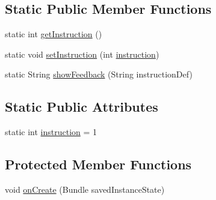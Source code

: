 \subsection*{Static Public Member Functions}
\begin{DoxyCompactItemize}
\item 
static int \mbox{\hyperlink{classcom_1_1example_1_1trainawearapplication_1_1_plank_a2220e1459dd56fb27948dcddf79bfcfa}{get\+Instruction}} ()
\item 
static void \mbox{\hyperlink{classcom_1_1example_1_1trainawearapplication_1_1_plank_a3cc3d10c2310227ff9fe69e49afac328}{set\+Instruction}} (int \mbox{\hyperlink{classcom_1_1example_1_1trainawearapplication_1_1_plank_a78c9024e55b5817aa05befcff69394c3}{instruction}})
\item 
static String \mbox{\hyperlink{classcom_1_1example_1_1trainawearapplication_1_1_plank_a14343873d9ff489757bebbad97adbaf1}{show\+Feedback}} (String instruction\+Def)
\end{DoxyCompactItemize}
\subsection*{Static Public Attributes}
\begin{DoxyCompactItemize}
\item 
static int \mbox{\hyperlink{classcom_1_1example_1_1trainawearapplication_1_1_plank_a78c9024e55b5817aa05befcff69394c3}{instruction}} = 1
\end{DoxyCompactItemize}
\subsection*{Protected Member Functions}
\begin{DoxyCompactItemize}
\item 
void \mbox{\hyperlink{classcom_1_1example_1_1trainawearapplication_1_1_plank_a8071af6c71d817914e58bd99b92c0904}{on\+Create}} (Bundle saved\+Instance\+State)
\end{DoxyCompactItemize}
